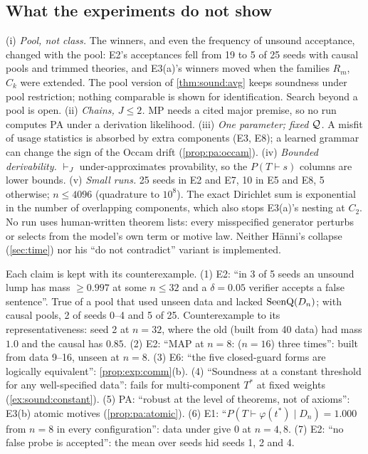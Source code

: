 \subsection{What the experiments do not show}\label{sec:exp:limits}

\begin{remark}[Limitations]\expbrk{}\label{rem:exp:limits}
(i) \emph{Pool, not class.} The winners, and even the frequency of unsound acceptance, changed with the pool: E2's acceptances fell from 19 to 5 of 25 seeds with causal pools and trimmed theories, and E3(a)'s winners moved when the families $R_m$, $C_k$ were extended. The pool version of \cref{thm:sound:avg} keeps soundness under pool restriction; nothing comparable is shown for identification. Search beyond a pool is open.
(ii) \emph{Chains, $J\le2$.} MP needs a cited major premise, so no run computes PA under a derivation likelihood.
(iii) \emph{One parameter; fixed $\mathcal{Q}$.} A misfit of usage statistics is absorbed by extra components (E3, E8); a learned grammar can change the sign of the Occam drift (\cref{prop:pa:occam}).
(iv) \emph{Bounded derivability.} $\vdash_J$ under-approximates provability, so the $P(T\vdash s)$ columns are lower bounds.
(v) \emph{Small runs.} 25 seeds in E2 and E7, 10 in E5 and E8, 5 otherwise; $n\le4096$ (quadrature to $10^8$). The exact Dirichlet sum is exponential in the number of overlapping components, which also stops E3(a)'s nesting at $C_2$.
No run uses human-written theorem lists: every misspecified generator perturbs or selects from the model's own term or motive law. Neither H\"anni's collapse (\cref{sec:time}) nor his ``do not contradict'' variant is implemented.
\end{remark}

\begin{remark}\expbrk{}\label{rem:exp:refuted}
Each claim is kept with its counterexample.
(1) E2: ``in 3 of 5 seeds an unsound lump has mass $\ge0.997$ at some $n\le32$ and a $\delta=0.05$ verifier accepts a false sentence''. True of a pool that used unseen data and lacked $\mathrm{SeenQ}(D_n)$; with causal pools, 2 of seeds 0--4 and 5 of 25. Counterexample to its representativeness: seed 2 at $n=32$, where the old  (built from 40 data) had mass $1.0$ and the causal  has $0.85$.
(2) E2: ``MAP at $n=8$: \DTRC($n=16$) three times'': built from data 9--16, unseen at $n=8$.
(3) E6: ``the five closed-guard forms are logically equivalent'': \cref{prop:exp:comm}(b).
(4) ``Soundness at a constant threshold for any well-specified data'': fails for multi-component $T^*$ at fixed weights (\cref{ex:sound:constant}).
(5) PA: ``robust at the level of theorems, not of axioms'': E3(b) atomic motives (\cref{prop:pa:atomic}).
(6) E1: ``$P(T\vdash\varphi(t^*)\mid D_n)=1.000$ from $n=8$ in every configuration'':  data under \Lzero{} give $0$ at $n=4,8$.
(7) E2: ``no false probe is accepted'': the mean over seeds hid seeds 1, 2 and 4.
\end{remark}

